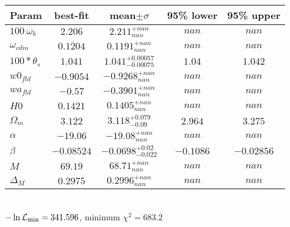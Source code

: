 \begin{tabular}{|l|c|c|c|c|} 
 \hline 
Param & best-fit & mean$\pm\sigma$ & 95\% lower & 95\% upper \\ \hline 
$100~\omega_{b }$ &$2.206$ & $2.211_{nan}^{+nan}$ & $nan$ & $nan$ \\ 
$\omega_{cdm }$ &$0.1204$ & $0.1191_{nan}^{+nan}$ & $nan$ & $nan$ \\ 
$100*\theta_{s }$ &$1.041$ & $1.041_{-0.00075}^{+0.00057}$ & $1.04$ & $1.042$ \\ 
$w0_{fld }$ &$-0.9054$ & $-0.9268_{nan}^{+nan}$ & $nan$ & $nan$ \\ 
$wa_{fld }$ &$-0.57$ & $-0.3901_{nan}^{+nan}$ & $nan$ & $nan$ \\ 
$H0$ &$0.1421$ & $0.1405_{nan}^{+nan}$ & $nan$ & $nan$ \\ 
$\Omega_{m }$ &$3.122$ & $3.118_{-0.09}^{+0.079}$ & $2.964$ & $3.275$ \\ 
$\alpha$ &$-19.06$ & $-19.08_{nan}^{+nan}$ & $nan$ & $nan$ \\ 
$\beta$ &$-0.08524$ & $-0.0698_{-0.022}^{+0.02}$ & $-0.1086$ & $-0.02856$ \\ 
$M$ &$69.19$ & $68.71_{nan}^{+nan}$ & $nan$ & $nan$ \\ 
$\Delta_{M }$ &$0.2975$ & $0.2996_{nan}^{+nan}$ & $nan$ & $nan$ \\ 
\hline 
 \end{tabular} \\ 
$-\ln{\cal L}_\mathrm{min} =341.596$, minimum $\chi^2=683.2$ \\ 
